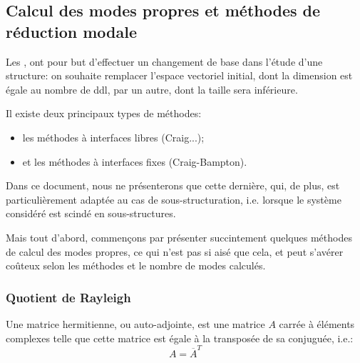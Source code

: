 \medskip
\subsection{Calcul des modes propres et méthodes de réduction modale}

Les , ont pour but d'effectuer un
changement de base dans l'étude d'une structure: on souhaite remplacer l'espace vectoriel initial, dont la dimension 
est égale au nombre de ddl, par un autre, dont la taille sera inférieure.

\medskip
Il existe deux principaux types de méthodes:
\begin{itemize}
   \item les méthodes à interfaces libres (Craig...);
   \item et les méthodes à interfaces fixes (Craig-Bampton).
\end{itemize}

Dans ce document, nous ne présenterons que cette dernière, qui, de plus, 
est particulièrement adaptée au cas de sous-structuration, i.e. lorsque le système considéré est scindé en 
sous-structures.

\medskip
Mais tout d'abord, commençons par présenter succintement quelques méthodes de calcul des modes propres, ce qui n'est 
pas si aisé que cela, et peut  s'avérer coûteux selon les méthodes et le nombre de modes calculés.




\medskip
\subsubsection{Quotient de Rayleigh}

\begin{definition}
Une matrice hermitienne, ou auto-adjointe, est une matrice $A$ carrée à éléments complexes  telle que 
cette matrice est égale à la transposée de sa conjuguée, i.e.:
\begin{equation}
A = \overline{A}^T
\end{equation}
\end{definition}

